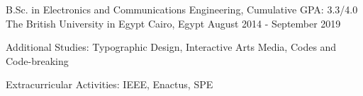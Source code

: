 \begin{cventries}
  \cventry
    {B.Sc. in Electronics and Communications Engineering, Cumulative GPA: 3.3/4.0}
    {The British University in Egypt}
    {Cairo, Egypt}
    {August 2014 - September 2019}
    {
      \begin{cvitems}
        \item{Additional Studies: Typographic Design, Interactive Arts Media, Codes and Code-breaking}
        \item {Extracurricular Activities: IEEE, Enactus, SPE}
      \end{cvitems}
    }
\end{cventries}
